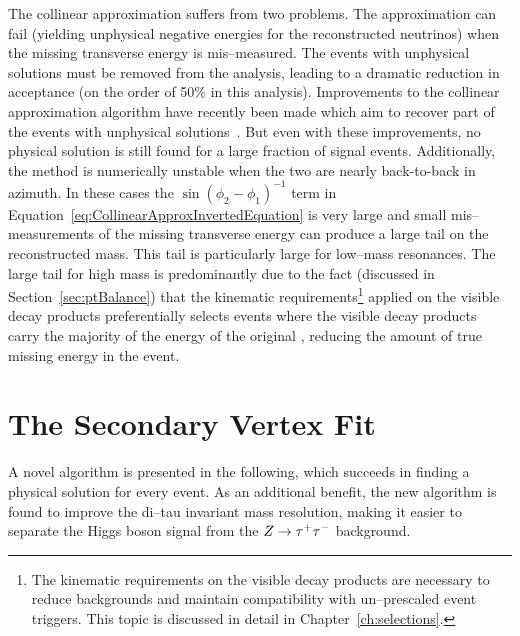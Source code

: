 The collinear approximation suffers from two problems.  The approximation can
fail (yielding unphysical negative energies for the reconstructed neutrinos)
when the missing transverse energy is mis--measured.  The events with unphysical
solutions must be removed from the analysis, leading to a dramatic reduction in
acceptance (on the order of 50\% in this analysis).  Improvements to the
collinear approximation algorithm have recently been made which aim to recover
part of the events with unphysical solutions~\cite{improvedCollinearApprox}.
But even with these improvements, no physical solution is still found for a
large fraction of signal events.  Additionally, the method is numerically
unstable when the two \taul are nearly back-to-back in azimuth.  In these cases
the $\sin(\phi_2 - \phi_1)^{-1}$ term in
Equation~\ref{eq:CollinearApproxInvertedEquation} is very large and small
mis--measurements of the missing transverse energy can produce a large tail on
the reconstructed mass.  This tail is particularly large for low--mass
resonances.  The large tail for high mass is predominantly due to the fact
(discussed in Section~\ref{sec:ptBalance}) that the kinematic
requirements\footnote{The kinematic requirements on the visible decay products
are necessary to reduce backgrounds and maintain compatibility with
un--prescaled event triggers.  This topic is discussed in detail in
Chapter~\ref{ch:selections}.} applied on the visible decay products
preferentially selects events where the visible decay products carry the
majority of the energy of the original \taul, reducing the amount of true
missing energy in the event.  

\section{The Secondary Vertex Fit}
A novel algorithm is presented in the following, which succeeds in finding a
physical solution for every event.  As an additional benefit, the new algorithm
is found to improve the di--tau invariant mass resolution, making it easier to
separate the Higgs boson signal from the $\mbox{\ensuremath{Z\to\tau^+\tau^-}}$ background.


